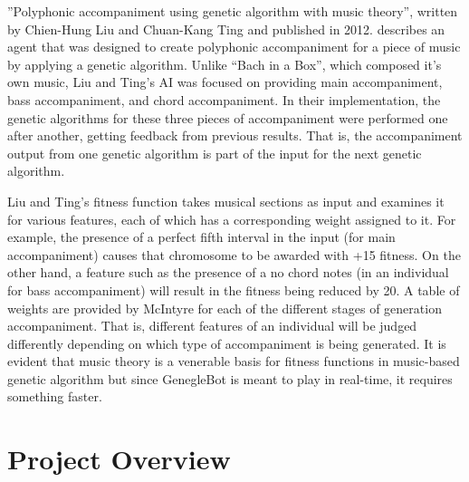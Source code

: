 \documentclass[conference]{IEEEtran}
\begin{document}
”Polyphonic accompaniment using genetic algorithm with music theory”, written by Chien-Hung Liu and Chuan-Kang Ting and published in 2012. describes an agent that was designed to create polyphonic accompaniment for a piece of music by applying a genetic algorithm\cite{b1}.  Unlike “Bach in a Box”, which composed it’s own music, Liu and Ting’s AI was focused on providing main accompaniment, bass accompaniment, and chord accompaniment\cite{b1}. In their implementation, the genetic algorithms for these three pieces of accompaniment were performed one after another, getting feedback from previous results. That is, the accompaniment output from one genetic algorithm is part of the input for the next genetic algorithm.

Liu and Ting’s fitness function takes musical sections as input and examines it for various features, each of which has a corresponding weight assigned to it. For example, the presence of a perfect fifth interval in the input (for main accompaniment) causes that chromosome to be awarded with +15 fitness. On the other hand, a feature such as the presence of a no chord notes (in an individual for bass accompaniment) will result in the fitness being reduced by 20. A table of weights are provided by McIntyre for each of the different stages of generation accompaniment. That is, different features of an individual will be judged differently depending on which type of accompaniment is being generated.  It is evident that music theory is a venerable basis for fitness functions in music-based genetic algorithm but since GenegleBot is meant to play in real-time, it requires something faster.

\section{Project Overview}
\end{document}
